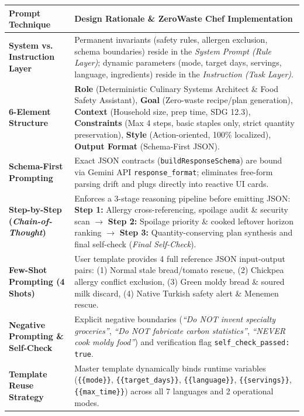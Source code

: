 \documentclass[9pt,a4paper]{article}
\begin{document}
\vspace{1pt}
{\scriptsize
\renewcommand{\arraystretch}{1.12}
\begin{tabularx}{\textwidth}{>{\bfseries\color{undpdark}}p{3.1cm} X}
\toprule
\textbf{Prompt Technique} & \textbf{Design Rationale \& ZeroWaste Chef Implementation} \\
\midrule
System vs. Instruction Layer & Permanent invariants (safety rules, allergen exclusion, schema boundaries) reside in the \emph{System Prompt (Rule Layer)}; dynamic parameters (mode, target days, servings, language, ingredients) reside in the \emph{Instruction (Task Layer)}. \\
6-Element Structure & \textbf{Role} (Deterministic Culinary Systems Architect \& Food Safety Assistant), \textbf{Goal} (Zero-waste recipe/plan generation), \textbf{Context} (Household size, prep time, SDG 12.3), \textbf{Constraints} (Max 4 steps, basic staples only, strict quantity preservation), \textbf{Style} (Action-oriented, 100\% localized), \textbf{Output Format} (Schema-First JSON). \\
Schema-First Prompting & Exact JSON contracts (\texttt{buildResponseSchema}) are bound via Gemini API \texttt{response\_format}; eliminates free-form parsing drift and plugs directly into reactive UI cards. \\
Step-by-Step (\emph{Chain-of-Thought}) & Enforces a 3-stage reasoning pipeline before emitting JSON: \textbf{Step 1:} Allergy cross-referencing, spoilage audit \& security scan $\rightarrow$ \textbf{Step 2:} Spoilage priority \& cooked leftover horizon ranking $\rightarrow$ \textbf{Step 3:} Quantity-conserving plan synthesis and final self-check (\emph{Final Self-Check}). \\
Few-Shot Prompting (4 Shots) & User template provides 4 full reference JSON input-output pairs: (1) Normal stale bread/tomato rescue, (2) Chickpea allergy conflict exclusion, (3) Green moldy bread \& soured milk discard, (4) Native Turkish safety alert \& Menemen rescue. \\
Negative Prompting \& Self-Check & Explicit negative boundaries (\emph{``Do NOT invent specialty groceries''}, \emph{``Do NOT fabricate carbon statistics''}, \emph{``NEVER cook moldy food''}) and verification flag \texttt{self\_check\_passed: true}. \\
Template Reuse Strategy & Master template dynamically binds runtime variables (\texttt{\{\{mode\}\}}, \texttt{\{\{target\_days\}\}}, \texttt{\{\{language\}\}}, \texttt{\{\{servings\}\}}, \texttt{\{\{max\_time\}\}}) across all 7 languages and 2 operational modes. \\
\bottomrule
\end{tabularx}
}
\end{document}

